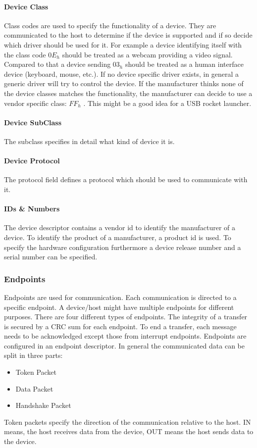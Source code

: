 \documentclass{acm_proc_article-sp}
\begin{document}
\paragraph{Device Class}
Class codes are used to specify the functionality of a device.
They are communicated to the host to determine if the device is supported and if so decide which driver should be used for it.
For example a device identifying itself with the class code $0E_h$ should be treated as a webcam providing a video signal.
Compared to that a device sending $03_h$ should be treated as a human interface device (keyboard, mouse, etc.).
If no device specific driver exists, in general a generic driver will try to control the device.
If the manufacturer thinks none of the device classes matches the functionality, the manufacturer can decide to use a
vendor specific class: $FF_h$ \cite{axel}.
This might be a good idea for a USB rocket launcher.

\paragraph{Device SubClass}
The subclass specifies in detail what kind of device it is.

\paragraph{Device Protocol}
The protocol field defines a protocol which should be used to communicate with it.

\paragraph{IDs \& Numbers}
The device descriptor contains a vendor id to identify the manufacturer of a device.
To identify the product of a manufacturer, a product id is used.
To specify the hardware configuration furthermore a device release number and a serial number can be specified.

\subsubsection{Endpoints}
Endpoints are used for communication.
Each communication is directed to a specific endpoint.
A device/host might have multiple endpoints for different purposes.
There are four different types of endpoints.
The integrity of a transfer is secured by a CRC sum for each endpoint.
To end a transfer, each message needs to be acknowledged except those from interrupt endpoints.
Endpoints are configured in an endpoint descriptor.
In general the communicated data can be split in three parts: \cite{beyond}
\begin{itemize}
\item Token Packet
\item Data Packet
\item Handshake Packet
\end{itemize}
Token packets specify the direction of the communication relative to the host.
IN means, the host receives data from the device, OUT means the host sends data to the device.\\
\end{document}

